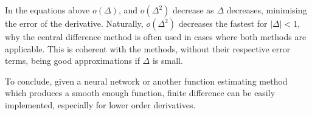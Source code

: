 In the equations above $o(\Delta)$, and $o(\Delta^2)$ decrease as $\Delta$ decreases, minimising the error of the derivative. Naturally, $o(\Delta^2)$ decreases the fastest for $|\Delta|<1$, why the central difference method is often used in cases where both methods are applicable. This is coherent with the methods, without their respective error terms, being good approximations if $\Delta$ is small.

To conclude, given a neural network or another function estimating method which produces a smooth enough function, finite difference can be easily implemented, especially for lower order derivatives. 



%




